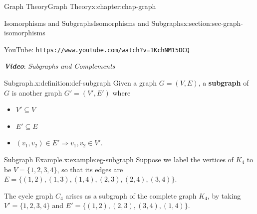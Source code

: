 \documentclass[oneside,10pt,]{book}
\newcommand{\mono}[1]{\texttt{#1}}
\newcommand{\alert}[1]{\textbf{\textit{#1}}}
\newcommand{\terminology}[1]{\textbf{#1}}
\numberwithin{equation}{section}
\newlength{\qrsize}
\newlength{\previewwidth}
\begin{document}
\begin{chapterptx}{Graph Theory}{}{Graph Theory}{}{}{x:chapter:chap-graph}
\begin{sectionptx}{Isomorphisms and Subgraphs}{}{Isomorphisms and Subgraphs}{}{}{x:section:sec-graph-isomorphisms}
\begin{sidebyside}{1}{0}{0}{0}
\begin{sbspanel}{1}
\begin{tcbraster}[raster columns=2, raster column skip=1pt, raster halign=center, raster force size=false, raster left skip=0pt, raster right skip=0pt]
\begin{tcolorbox}[previewstyle, width=\previewwidth]
\end{tcolorbox}%
\begin{tcolorbox}[qrstyle]%
{\hypersetup{urlcolor=black}}%
\end{tcolorbox}%
\begin{tcolorbox}[captionstyle]%
\small YouTube: \mono{https://www.youtube.com/watch?v=1KchNM15DCQ}\end{tcolorbox}%
\end{tcbraster}%
\end{sbspanel}%
\end{sidebyside}%
\par
\alert{Video}: \emph{Subgraphs and Complements}%
\begin{definition}{Subgraph.}{x:definition:def-subgraph}%
Given a graph \(G = (V,E)\), a \terminology{subgraph} of \(G\) is another graph \(G' = (V', E')\) where%
\begin{itemize}[label=\textbullet]
\item{}\(\displaystyle V' \subseteq V\)%
\item{}\(\displaystyle E' \subseteq E\)%
\item{}\((v_1,v_2) \in E' \Rightarrow v_1,v_2 \in V'\).%
\end{itemize}
%
\end{definition}
\begin{example}{Subgraph Example.}{x:example:eg-subgraph}%
Suppose we label the vertices of \(K_4\) to be \(V = \{1,2,3,4\}\), so that its edges are \(E = \{(1,2),(1,3),(1,4),(2,3),(2,4),(3,4)\}\).%
\par
The cycle graph \(C_4\) arises as a subgraph of the complete graph \(K_4\), by taking \(V' = \{1,2,3,4\}\) and \(E' = \{(1,2),(2,3),(3,4),(1,4)\}\).%
\begin{sidebyside}{1}{0.375}{0.375}{0}%
\begin{sbspanel}{0.25}%
\end{sbspanel}
\end{sidebyside}
\end{example}
\end{sectionptx}
\end{chapterptx}
\end{document}
